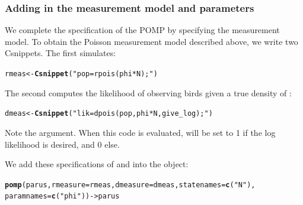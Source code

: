 \documentclass{beamer}\usepackage[]{graphicx}\usepackage[]{color}
\makeatletter
\newcommand{\hlstr}[1]{\textcolor[rgb]{0.192,0.494,0.8}{#1}}%
\newcommand{\hlstd}[1]{\textcolor[rgb]{0.345,0.345,0.345}{#1}}%
\newcommand{\hlkwb}[1]{\textcolor[rgb]{0.69,0.353,0.396}{#1}}%
\newcommand{\hlkwc}[1]{\textcolor[rgb]{0.333,0.667,0.333}{#1}}%
\newcommand{\hlkwd}[1]{\textcolor[rgb]{0.737,0.353,0.396}{\textbf{#1}}}%
\newenvironment{kframe}{%
 \def\at@end@of@kframe{}%
 \ifinner\ifhmode%
  \def\at@end@of@kframe{\end{minipage}}%
  \begin{minipage}{\columnwidth}%
 \fi\fi%
 \def\FrameCommand##1{\hskip\@totalleftmargin \hskip-\fboxsep
 \colorbox{shadecolor}{##1}\hskip-\fboxsep
     \hskip-\linewidth \hskip-\@totalleftmargin \hskip\columnwidth}%
 \MakeFramed {\advance\hsize-\width
   \@totalleftmargin\z@ \linewidth\hsize
   \@setminipage}}%
 {\par\unskip\endMakeFramed%
 \at@end@of@kframe}
\newenvironment{knitrout}{}{} %
\makeatother
\begin{document}
\begin{frame}[fragile]

\frametitle{Adding in the measurement model and parameters}

\bi

\item We complete the specification of the POMP by specifying the measurement model.
To obtain the Poisson measurement model described above, we write two Csnippets. The first simulates:
\ei
\begin{knitrout}\small
{}\color{fgcolor}\begin{kframe}
\begin{alltt}
\hlstd{rmeas} \hlkwb{<-} \hlkwd{Csnippet}\hlstd{(}\hlstr{"pop = rpois(phi*N);"}\hlstd{)}
\end{alltt}
\end{kframe}
\end{knitrout}
\bi
\item The second computes the likelihood of observing  birds given a true density of :
\ei
\begin{knitrout}\small
{}\color{fgcolor}\begin{kframe}
\begin{alltt}
\hlstd{dmeas} \hlkwb{<-} \hlkwd{Csnippet}\hlstd{(}\hlstr{"lik = dpois(pop,phi*N,give_log);"}\hlstd{)}
\end{alltt}
\end{kframe}
\end{knitrout}
\bi
\item Note the  argument. When this code is evaluated,  will be set to 1 if the log likelihood is desired, and 0 else.

\item We add these specifications of  and  into the  object:
\ei

\begin{knitrout}\small
{}\color{fgcolor}\begin{kframe}
\begin{alltt}
\hlkwd{pomp}\hlstd{(parus,}\hlkwc{rmeasure}\hlstd{=rmeas,}\hlkwc{dmeasure}\hlstd{=dmeas,}\hlkwc{statenames}\hlstd{=}\hlkwd{c}\hlstd{(}\hlstr{"N"}\hlstd{),}
  \hlkwc{paramnames}\hlstd{=}\hlkwd{c}\hlstd{(}\hlstr{"phi"}\hlstd{))} \hlkwb{->} \hlstd{parus}
\end{alltt}
\end{kframe}
\end{knitrout}

\end{frame}
\end{document}
